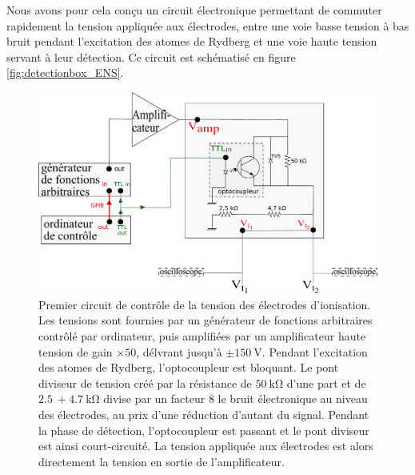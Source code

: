 Nous avons pour cela conçu un circuit électronique permettant de commuter rapidement la tension appliquée aux électrodes, entre une voie basse tension à bas bruit pendant l'excitation des atomes de Rydberg et une voie haute tension servant à leur détection.
Ce circuit est schématisé en figure \eqref{fig:detectionbox_ENS}.
%
\begin{figure}[!h]
\centering
\includegraphics[width=.8\linewidth]{figures/setup/rydberg/detectionbox_ENS}
\caption[Premier circuit de contrôle de la tension des électrodes d'ionisation]{
Premier circuit de contrôle de la tension des électrodes d'ionisation.
Les tensions sont fournies par un générateur de fonctions arbitraires contrôlé par ordinateur, puis amplifiées par un amplificateur haute tension de gain $\times \num{50}$, délvrant jusqu'à $\pm \SI{150}{\V}$.
Pendant l'excitation des atomes de Rydberg, l'optocoupleur est bloquant.
Le pont diviseur de tension créé par la résistance de $\SI{50}{\kilo\ohm}$ d'une part et de $\SI{2.5}{} + \SI{4.7}{\kilo\ohm}$ divise par un facteur $\num{8}$ le bruit électronique au niveau des électrodes, au prix d'une réduction d'autant du signal.
Pendant la phase de détection, l'optocoupleur est passant et le pont diviseur est ainsi court-circuité.
La tension appliquée aux électrodes est alors directement la tension en sortie de l'amplificateur.
}
\label{fig:detectionbox_ENS}
\end{figure}
%

